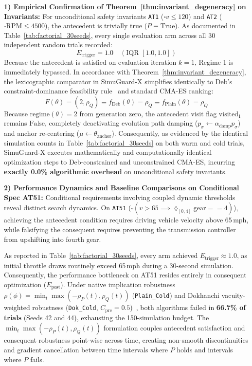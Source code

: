 \documentclass[journal]{IEEEtran}
\begin{document}
\noindent\textbf{1) Empirical Confirmation of Theorem~\ref{thm:invariant_degeneracy} on Invariants:}
For unconditional safety invariants \texttt{AT1} ($\square v \le 120$) and \texttt{AT2} ($\square \text{RPM} \le 4500$), the antecedent is trivially true ($P \equiv \text{True}$). As documented in Table~\ref{tab:factorial_30seeds}, every single evaluation arm across all 30 independent random trials recorded:
\begin{equation}
E_{\mathrm{trigger}} = 1.0 \quad (\text{IQR } [1.0, 1.0])
\end{equation}
Because the antecedent is satisfied on evaluation iteration $k = 1$, Regime 1 is immediately bypassed. In accordance with Theorem~\ref{thm:invariant_degeneracy}, the lexicographic comparator in SimuGuard-X simplifies identically to Deb's constraint-dominance feasibility rule~\cite{deb2000efficient} and standard CMA-ES ranking:
\begin{equation}
F(\theta) = (2, \rho_Q) \equiv f_{\mathrm{Deb}}(\theta) = \rho_Q \equiv f_{\mathrm{Plain}}(\theta) = \rho_Q
\end{equation}
Because $\mathrm{regime}(\theta) = 2$ from generation zero, the antecedent visit flag $\mathrm{visited}_1$ remains $\mathrm{False}$, completely deactivating evolution path damping ($p_\sigma \leftarrow \alpha_{\mathrm{damp}} p_\sigma$) and anchor re-centering ($\mu \leftarrow \theta_{\mathrm{anchor}}$). Consequently, as evidenced by the identical simulation counts in Table~\ref{tab:factorial_30seeds} on both warm and cold trials, SimuGuard-X executes mathematically and computationally identical optimization steps to Deb-constrained and unconstrained CMA-ES, incurring \textbf{exactly 0.0\% algorithmic overhead} on unconditional safety invariants.

\noindent\textbf{2) Performance Dynamics and Baseline Comparisons on Conditional Spec AT51:}
Conditional requirements involving coupled dynamic thresholds reveal distinct search dynamics. On \texttt{AT51} ($\square(v > 65 \implies \lozenge_{[0, 4]} \text{gear} == 4)$), achieving the antecedent condition requires driving vehicle velocity above 65\,mph, while falsifying the consequent requires preventing the transmission controller from upshifting into fourth gear.

As reported in Table~\ref{tab:factorial_30seeds}, every arm achieved $E_{\mathrm{trigger}} \approx 1.0$, as initial throttle draws routinely exceed 65\,mph during a 30-second simulation. Consequently, the performance bottleneck on AT51 resides entirely in consequent optimization ($E_{\mathrm{post}}$). Under native implication robustness $\rho(\phi) = \min_t \max(-\rho_P(t), \rho_Q(t))$ (\texttt{Plain\_Cold}) and Dokhanchi vacuity-weighted robustness (\texttt{Dok\_Cold}, $C_{\mathrm{pre}} = 0.5$)~\cite{dokhanchi2018vacuity}, both algorithms failed in \textbf{66.7\% of trials} (Seeds 42 and 44), exhausting the 150-simulation budget. The $\min_t \max(-\rho_P(t), \rho_Q(t))$ formulation couples antecedent satisfaction and consequent robustness point-wise across time, creating non-smooth discontinuities and gradient cancellation between time intervals where $P$ holds and intervals where $P$ fails.
\end{document}
